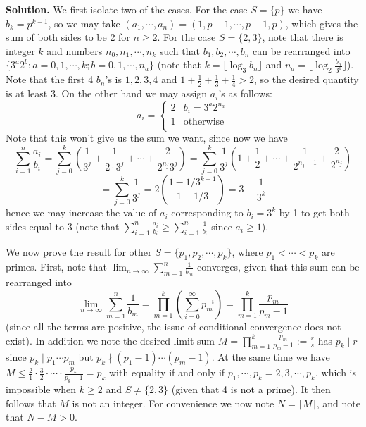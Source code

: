 \documentclass[11pt,a4paper]{article}
\begin{document}
\begin{enumerate}
    	\textbf{Solution.} We first isolate two of the cases. 
    	For the case $S=\{p\}$ we have $b_k = p^{k-1}$, 
    	so we may take $(a_1, \cdots, a_n) = (1, p - 1, \cdots, p - 1, p)$, 
    	which gives the sum of both sides to be 2 for $n\ge 2$. 
    	For the case $S=\{2, 3\}$, 
    	note that there is integer $k$ and numbers $n_0, n_1, \cdots, n_k$ such that $b_1, b_2, \cdots, b_n$ can be rearranged into 
    	$\{3^a2^b: a=0, 1, \cdots, k; b=0, 1, \cdots, n_a\}$
    	(note that $k=\lfloor \log_3 b_n\rfloor$ and 
    	$n_a = \lfloor \log_2 \frac{b_n}{3^a}\rfloor$). 
    	Note that the first 4 $b_n$'s is $1, 2, 3, 4$ and $1+\frac 12 + \frac 13 + \frac 14 > 2$, 
    	so the desired quantity is at least 3. 
    	On the other hand we may assign $a_i$'s as follows: 
    	\[
    	a_i=
    	\begin{cases}
    		2 & b_i = 3^a2^{n_a}\\
    		1 & \text{otherwise}\\
    	\end{cases}
    	\]
    	Note that this won't give us the sum we want, since now we have 
    	\[
    	\sum_{i=1}^n \frac{a_i}{b_i}
    	=\sum_{j=0}^k \left(\frac{1}{3^j}+\frac{1}{2\cdot 3^j} + \cdots + \frac{2}{2^{n_j}3^j}\right)
    	=\sum_{j=0}^k \frac{1}{3^j}\left(1+\frac{1}{2} + \cdots + \frac{1}{2^{n_j-1}}+\frac{2}{2^{n_j}}\right)
    	\]
    	\[
    	=\sum_{j=0}^k \frac{1}{3^j}
    	=2\left(\frac{1 - 1/3^{k + 1}}{1 - 1/3}\right)
    	=3 - \frac{1}{3^k}
    	\]
    	hence we may increase the value of $a_i$ corresponding to $b_i=3^k$ by 1 to get both sides equal to 3 
    	(note that $\sum_{i=1}^n \frac{a_i}{b_i}\ge \sum_{i=1}^n \frac{1}{b_i}$ since $a_i\ge 1$). 
    	
    	We now prove the result for other $S=\{p_1, p_2, \cdots, p_k\}$, where $p_1 < \cdots < p_k$ are primes. 
    	First, note that $\lim_{n\to\infty}\sum_{m=1}^n \frac{1}{b_m}$ converges, given that this sum can be rearranged into 
    	\[
    	\lim_{n\to\infty}\sum_{m=1}^n \frac{1}{b_m}
    	=\prod_{m=1}^k \left(\sum_{i=0}^{\infty}p_m^{-i}\right)
    	=\prod_{m=1}^k \frac{p_m}{p_m - 1}
    	\]
    	(since all the terms are positive, 
    	the issue of conditional convergence does not exist). 
    	In addition we note the desired limit sum 
    	$M = \prod_{m=1}^k \frac{p_m}{p_m - 1} := \frac{r}{s}$ 
    	has $p_k\mid r$ 
    	since $p_k\mid p_1\cdots p_m$ but $p_k\nmid (p_1-1)\cdots (p_m-1)$. 
    	At the same time we have 
    	$M \le \frac{2}{1}\cdot \frac{3}{2}\cdot \cdots \cdot \frac{p_k}{p_k-1}=p_k$ 
    	with equality if and only if 
    	$p_1, \cdots, p_k = 2, 3, \cdots, p_k$, 
    	which is impossible when $k\ge 2$ and $S\neq\{2, 3\}$ 
    	(given that 4 is not a prime). 
    	It then follows that $M$ is not an integer. 
    	For convenience we now note $N = \lceil M\rceil$, 
    	and note that $N-M>0$. 
    	

\end{enumerate}
\end{document}
